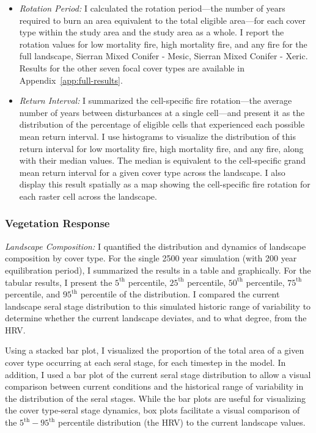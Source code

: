 \begin{itemize}
	\item \emph{Rotation Period:} I calculated the rotation period---the number of years required to burn an area equivalent to the total eligible area---for each cover type within the study area and the study area as a whole. I report the rotation values for low mortality fire, high mortality fire, and any fire for the full landscape, Sierran Mixed Conifer - Mesic, Sierran Mixed Conifer - Xeric. Results for the other seven focal cover types are available in Appendix~\ref{app:full-results}.
	\item \emph{Return Interval:} I summarized the cell-specific fire rotation---the average number of years between disturbances at a single cell---and present it as the distribution of the percentage of eligible cells that experienced each possible mean return interval. I use histograms to visualize the distribution of this return interval for low mortality fire, high mortality fire, and any fire, along with their median values. The median is equivalent to the cell-specific grand mean return interval for a given cover type across the landscape. I also display this result spatially as a map showing the cell-specific fire rotation for each raster cell across the landscape. 
\end{itemize}

\subsubsection*{Vegetation Response} 

\emph{Landscape Composition:} I quantified the distribution and dynamics of landscape composition by cover type. For the single 2500 year simulation (with 200 year equilibration period), I summarized the results in a table and graphically. For the tabular results, I present the $5^{\text{th}}$ percentile, $25^{\text{th}}$ percentile, $50^{\text{th}}$ percentile, $75^{\text{th}}$ percentile, and $95^{\text{th}}$ percentile of the distribution. I compared the current landscape seral stage distribution to this simulated historic range of variability to determine whether the current landscape deviates, and to what degree, from the HRV. 

Using a stacked bar plot, I visualized the proportion of the total area of a given cover type occurring at each seral stage, for each timestep in the model. In addition, I used a bar plot of the current seral stage distribution to allow a visual comparison between current conditions and the historical range of variability in the distribution of the seral stages. While the bar plots are useful for visualizing the cover type-seral stage dynamics, box plots facilitate a visual comparison of the $5^{\text{th}}-95^{\text{th}}$ percentile distribution (the HRV) to the current landscape values.


